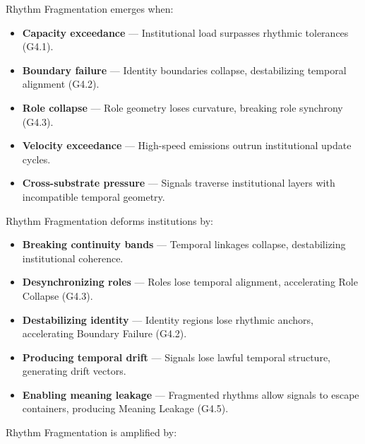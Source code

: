 \noindent Rhythm Fragmentation emerges when:

\begin{itemize}[leftmargin=1.2cm]
    \item \textbf{Capacity exceedance} — Institutional load surpasses rhythmic
    tolerances (G4.1).

    \item \textbf{Boundary failure} — Identity boundaries collapse, destabilizing
    temporal alignment (G4.2).

    \item \textbf{Role collapse} — Role geometry loses curvature, breaking role
    synchrony (G4.3).

    \item \textbf{Velocity exceedance} — High-speed emissions outrun institutional
    update cycles.

    \item \textbf{Cross-substrate pressure} — Signals traverse institutional
    layers with incompatible temporal geometry.
\end{itemize}

\medskip

\noindent Rhythm Fragmentation deforms institutions by:

\begin{itemize}[leftmargin=1.2cm]
    \item \textbf{Breaking continuity bands} — Temporal linkages collapse,
    destabilizing institutional coherence.

    \item \textbf{Desynchronizing roles} — Roles lose temporal alignment,
    accelerating Role Collapse (G4.3).

    \item \textbf{Destabilizing identity} — Identity regions lose rhythmic
    anchors, accelerating Boundary Failure (G4.2).

    \item \textbf{Producing temporal drift} — Signals lose lawful temporal
    structure, generating drift vectors.

    \item \textbf{Enabling meaning leakage} — Fragmented rhythms allow signals to
    escape containers, producing Meaning Leakage (G4.5).
\end{itemize}

\medskip

\noindent Rhythm Fragmentation is amplified by:

